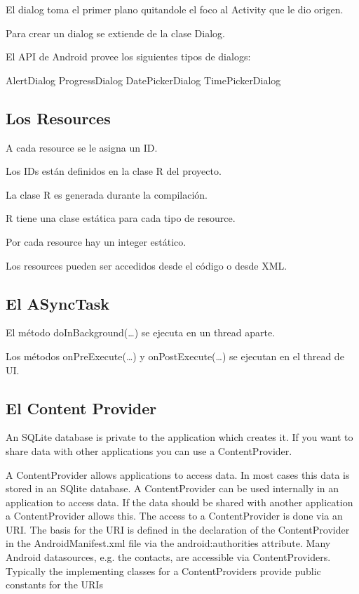El dialog toma el primer plano quitandole el foco al Activity  que le dio origen.

Para crear un dialog se extiende de la clase Dialog.

El API de Android provee los siguientes tipos de dialogs:

AlertDialog
ProgressDialog
DatePickerDialog
TimePickerDialog

\subsection{Los Resources}
\label{subsec:dev.resources}

A cada resource se le asigna un ID.

Los IDs est\'an definidos en la clase R del proyecto.

La clase R es generada durante la compilaci\'on.

R tiene una clase est\'atica para cada tipo de resource.

Por cada resource hay un integer est\'atico.

Los resources pueden ser accedidos desde el c\'odigo o desde XML.

\subsection{El ASyncTask}
\label{subsec:dev.asynctask}

El método doInBackground(…) se ejecuta en un thread  aparte.

Los métodos onPreExecute(…)  y onPostExecute(…) se  ejecutan en el thread de UI. 

\subsection{El Content Provider}
\label{subsec:dev.contentProvider}

An SQLite database is private to the application which creates it. If you want to share data with other applications you can use a ContentProvider.

A ContentProvider allows applications to access data. In most cases this data is stored in an SQlite database.
A ContentProvider can be used internally in an application to access data. If the data should be shared with another application a ContentProvider allows this.
The access to a ContentProvider is done via an URI. The basis for the URI is defined in the declaration of the ContentProvider in the AndroidManifest.xml file via the android:authorities attribute.
Many Android datasources, e.g. the contacts, are accessible via ContentProviders. Typically the implementing classes for a ContentProviders provide public constants for the URIs

